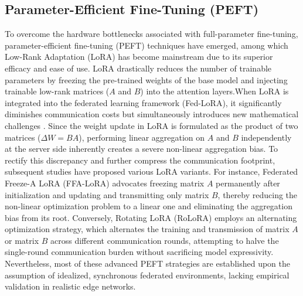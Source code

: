 \subsection{Parameter-Efficient Fine-Tuning (PEFT)}To overcome the hardware bottlenecks associated with full-parameter fine-tuning, parameter-efficient fine-tuning (PEFT) techniques have emerged, among which Low-Rank Adaptation (LoRA) \cite{hu2021lora} has become mainstream due to its superior efficacy and ease of use. LoRA drastically reduces the number of trainable parameters by freezing the pre-trained weights of the base model and injecting trainable low-rank matrices ($A$ and $B$) into the attention layers.When LoRA is integrated into the federated learning framework (Fed-LoRA), it significantly diminishes communication costs but simultaneously introduces new mathematical challenges \cite{zhang2023fedpet}. Since the weight update in LoRA is formulated as the product of two matrices ($\Delta W = BA$), performing linear aggregation on $A$ and $B$ independently at the server side inherently creates a severe non-linear aggregation bias. To rectify this discrepancy and further compress the communication footprint, subsequent studies have proposed various LoRA variants. For instance, Federated Freeze-A LoRA (FFA-LoRA) \cite{ffa_lora_paper} advocates freezing matrix $A$ permanently after initialization and updating and transmitting only matrix $B$, thereby reducing the non-linear optimization problem to a linear one and eliminating the aggregation bias from its root. Conversely, Rotating LoRA (RoLoRA) \cite{rolora_paper} employs an alternating optimization strategy, which alternates the training and transmission of matrix $A$ or matrix $B$ across different communication rounds, attempting to halve the single-round communication burden without sacrificing model expressivity. Nevertheless, most of these advanced PEFT strategies are established upon the assumption of idealized, synchronous federated environments, lacking empirical validation in realistic edge networks.

